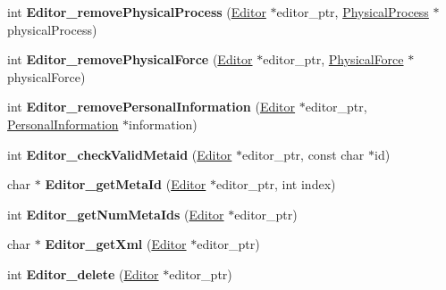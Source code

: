 \begin{DoxyCompactItemize}
\item 
\mbox{\label{namespaceomexmeta_a8b8f9382a445fca997eb8db8963cce4e}} 
int {\bfseries Editor\+\_\+remove\+Physical\+Process} (\hyperlink{classomexmeta_1_1Editor}{Editor} $\ast$editor\+\_\+ptr, \hyperlink{classomexmeta_1_1PhysicalProcess}{Physical\+Process} $\ast$physical\+Process)
\item 
\mbox{\label{namespaceomexmeta_a5d9f7c0c294472359ce3d70db5cb1035}} 
int {\bfseries Editor\+\_\+remove\+Physical\+Force} (\hyperlink{classomexmeta_1_1Editor}{Editor} $\ast$editor\+\_\+ptr, \hyperlink{classomexmeta_1_1PhysicalForce}{Physical\+Force} $\ast$physical\+Force)
\item 
\mbox{\label{namespaceomexmeta_aac121eb946b9380ca162061ab725dad0}} 
int {\bfseries Editor\+\_\+remove\+Personal\+Information} (\hyperlink{classomexmeta_1_1Editor}{Editor} $\ast$editor\+\_\+ptr, \hyperlink{classomexmeta_1_1PersonalInformation}{Personal\+Information} $\ast$information)
\item 
\mbox{\label{namespaceomexmeta_a8127880005ca59e64ae81fe57cd824fa}} 
int {\bfseries Editor\+\_\+check\+Valid\+Metaid} (\hyperlink{classomexmeta_1_1Editor}{Editor} $\ast$editor\+\_\+ptr, const char $\ast$id)
\item 
\mbox{\label{namespaceomexmeta_aec2f4973721ccc82ae54980e951f7565}} 
char $\ast$ {\bfseries Editor\+\_\+get\+Meta\+Id} (\hyperlink{classomexmeta_1_1Editor}{Editor} $\ast$editor\+\_\+ptr, int index)
\item 
\mbox{\label{namespaceomexmeta_a6a97e52deef1b7abde9b4491de14f68b}} 
int {\bfseries Editor\+\_\+get\+Num\+Meta\+Ids} (\hyperlink{classomexmeta_1_1Editor}{Editor} $\ast$editor\+\_\+ptr)
\item 
\mbox{\label{namespaceomexmeta_a96e4c18dc172184811a0bd6468d00b35}} 
char $\ast$ {\bfseries Editor\+\_\+get\+Xml} (\hyperlink{classomexmeta_1_1Editor}{Editor} $\ast$editor\+\_\+ptr)
\item 
\mbox{\label{namespaceomexmeta_ade855a67befd16925ed583d228606d43}} 
int {\bfseries Editor\+\_\+delete} (\hyperlink{classomexmeta_1_1Editor}{Editor} $\ast$editor\+\_\+ptr)

\end{DoxyCompactItemize}
